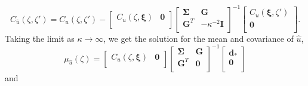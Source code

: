 \documentclass[10pt,letter]{article}
\begin{document}
\begin{equation}\label{eq:PosteriorCov2}
C_{\hat{u}}(\zeta,\zeta') = C_u(\zeta,\zeta') - 
                    \left[\begin{array}{cc}
                          C_u(\zeta,\bm{\xi}) & \bm{0} \\
                          \end{array}\right]
                    \left[\begin{array}{cc}
                          \bm{\Sigma} & \bm{G} \\
                          \bm{G}^T  & -\kappa^{-2} \bm{I} \\
                          \end{array}\right]^{-1}
                    \left[\begin{array}{c}
                          C_u(\bm{\xi},\zeta') \\
                          \bm{0} \\
                          \end{array}\right].
\end{equation}
Taking the limit as $\kappa \to \infty$, we get the solution for the mean and covariance of $\hat{u}$,
 \begin{equation}\label{eq:PosteriorMean3}
\mu_{\hat{u}}(\zeta) = \left[\begin{array}{cc}
                         C_u(\zeta,\bm{\xi}) & \bm{0} \\
                         \end{array}\right]
                   \left[\begin{array}{cc}
                         \bm{\Sigma} & \bm{G} \\
                         \bm{G}^T  & \bm{0} \\
                         \end{array}\right]^{-1}
                   \left[\begin{array}{c}
                         \bm{d}_* \\
                         \bm{0} \\
                         \end{array}\right]
\end{equation}    
and
\end{document}
